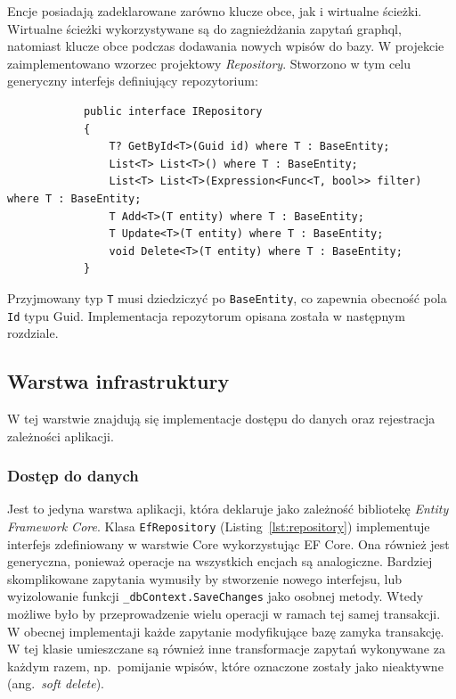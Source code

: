 		Encje posiadają zadeklarowane zarówno klucze obce, jak i wirtualne ścieżki.
		Wirtualne ścieżki wykorzystywane są do zagnieżdżania zapytań graphql, natomiast klucze obce podczas dodawania nowych wpisów do bazy.
		W projekcie zaimplementowano wzorzec projektowy \emph{Repository}.
		Stworzono w tym celu generyczny interfejs definiujący repozytorium:
		\begin{lstlisting}
			public interface IRepository
			{
				T? GetById<T>(Guid id) where T : BaseEntity;
				List<T> List<T>() where T : BaseEntity;
				List<T> List<T>(Expression<Func<T, bool>> filter) where T : BaseEntity;
				T Add<T>(T entity) where T : BaseEntity;
				T Update<T>(T entity) where T : BaseEntity;
				void Delete<T>(T entity) where T : BaseEntity;
			}
		\end{lstlisting}
		Przyjmowany typ \verb|T| musi dziedziczyć po \verb|BaseEntity|, co zapewnia obecność pola \verb|Id| typu Guid.
		Implementacja repozytorum opisana została w następnym rozdziale.

	\subsection{Warstwa infrastruktury}
		W tej warstwie znajdują się implementacje dostępu do danych oraz rejestracja zależności aplikacji.

		\subsubsection*{Dostęp do danych}
			Jest to jedyna warstwa aplikacji, która deklaruje jako zależność bibliotekę \emph{Entity Framework Core}.
			Klasa \verb|EfRepository| (Listing~\ref{lst:repository}) implementuje interfejs zdefiniowany w warstwie Core wykorzystując EF Core.
			Ona również jest generyczna, ponieważ operacje na wszystkich encjach są analogiczne.
			Bardziej skomplikowane zapytania wymusiły by stworzenie nowego interfejsu, lub wyizolowanie funkcji \verb|_dbContext.SaveChanges| jako osobnej metody.
			Wtedy możliwe było by przeprowadzenie wielu operacji w ramach tej samej transakcji.
			W obecnej implementaji każde zapytanie modyfikujące bazę zamyka transakcję.
			W tej klasie umieszczane są również inne transformacje zapytań wykonywane za każdym razem,
			np.\ pomijanie wpisów, które oznaczone zostały jako nieaktywne (ang.\ \emph{soft delete}).

